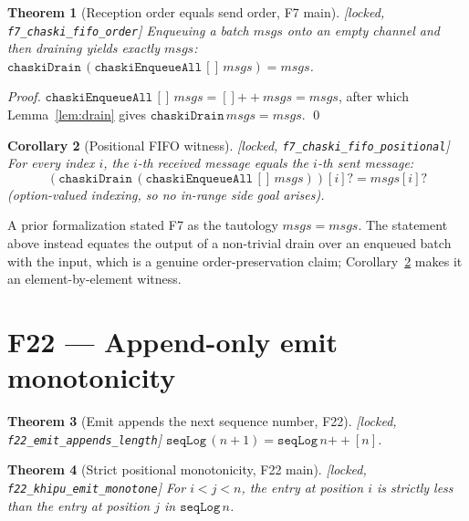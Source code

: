 \documentclass[11pt,letterpaper]{article}
\newtheorem{theorem}{Theorem}[section]
\newtheorem{corollary}[theorem]{Corollary}
\theoremstyle{definition}
\begin{document}
\begin{theorem}[Reception order equals send order, F7 main]\label{thm:f7}
\emph{[locked, \texttt{f7\_chaski\_fifo\_order}]} Enqueuing a batch
$\mathit{msgs}$ onto an empty channel and then draining yields exactly
$\mathit{msgs}$: $\texttt{chaskiDrain}\,(\texttt{chaskiEnqueueAll}\,[]\,
\mathit{msgs}) = \mathit{msgs}$.
\end{theorem}

\begin{proof}
$\texttt{chaskiEnqueueAll}\,[]\,\mathit{msgs} = []\mathbin{+\!\!+}\mathit{msgs}
= \mathit{msgs}$, after which Lemma~\ref{lem:drain} gives
$\texttt{chaskiDrain}\,\mathit{msgs} = \mathit{msgs}$. \qed
\end{proof}

\begin{corollary}[Positional FIFO witness]\label{cor:f7pos}
\emph{[locked, \nolinkurl{f7_chaski_fifo_positional}]} For every index $i$, the
$i$-th received message equals the $i$-th sent message:
\[
(\texttt{chaskiDrain}\,(\texttt{chaskiEnqueueAll}\,[]\,\mathit{msgs}))[i]?
= \mathit{msgs}[i]?
\]
(option-valued indexing, so no in-range side goal arises).
\end{corollary}

A prior formalization stated F7 as the tautology $\mathit{msgs} = \mathit{msgs}$.
The statement above instead equates the output of a non-trivial drain over an
enqueued batch with the input, which is a genuine order-preservation claim;
Corollary~\ref{cor:f7pos} makes it an element-by-element witness.

\section{F22 --- Append-only emit monotonicity}\label{sec:f22}

\begin{theorem}[Emit appends the next sequence number, F22]\label{thm:f22-append}
\emph{[locked, \nolinkurl{f22_emit_appends_length}]} $\texttt{seqLog}\,(n+1) =
\texttt{seqLog}\,n \mathbin{+\!\!+} [n]$.
\end{theorem}

\begin{theorem}[Strict positional monotonicity, F22 main]\label{thm:f22}
\emph{[locked, \texttt{f22\_khipu\_emit\_monotone}]} For $i < j < n$, the entry at
position $i$ is strictly less than the entry at position $j$ in
$\texttt{seqLog}\,n$.
\end{theorem}
\end{document}
